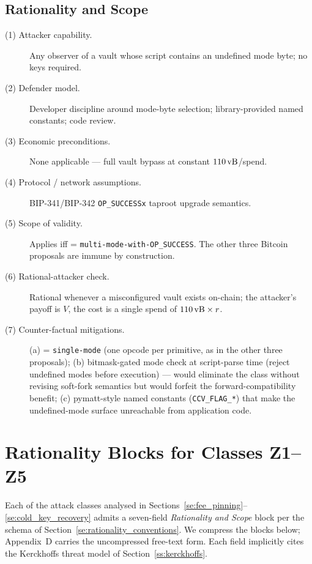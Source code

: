 \subsection{Rationality and Scope}
\label{ss:rat_classmode}
\begin{description}
\item[(1) Attacker capability.] Any observer of a vault whose script
  contains an undefined mode byte; no keys required.
\item[(2) Defender model.] Developer discipline around mode-byte
  selection; library-provided named constants; code review.
\item[(3) Economic preconditions.] None applicable ---
  full vault bypass at constant $110\,\text{vB}{}$/spend.
\item[(4) Protocol / network assumptions.] BIP-341/BIP-342
  \texttt{OP\_SUCCESSx} taproot upgrade semantics.
\item[(5) Scope of validity.] Applies iff \axopsurf{} =
  \texttt{multi-mode-with-OP\_SUCCESS}. The other three
  Bitcoin proposals are immune by construction.
\item[(6) Rational-attacker check.] Rational whenever a misconfigured
  vault exists on-chain; the attacker's payoff is $V$, the cost is
  a single spend of $110\,\text{vB}{} \times r$.
\item[(7) Counter-factual mitigations.] (a) \axopsurf{} =
  \texttt{single-mode} (one opcode per primitive, as in the other
  three proposals); (b) bitmask-gated mode check at script-parse
  time (reject undefined modes before execution) --- would eliminate
  the class without revising soft-fork semantics but would forfeit
  the forward-compatibility benefit; (c) pymatt-style named
  constants (\texttt{CCV\_FLAG\_*}) that make the undefined-mode
  surface unreachable from application code.
\end{description}

\section{Rationality Blocks for Classes Z1--Z5}
\label{se:rationality_blocks}

Each of the attack classes analysed in
Sections~\ref{se:fee_pinning}--\ref{se:cold_key_recovery} admits a
seven-field \emph{Rationality and Scope} block per the schema of
Section~\ref{se:rationality_conventions}. We compress the blocks
below; Appendix~D carries the uncompressed free-text form. Each
field implicitly cites the Kerckhoffs threat model of
Section~\ref{ss:kerckhoffs}.

